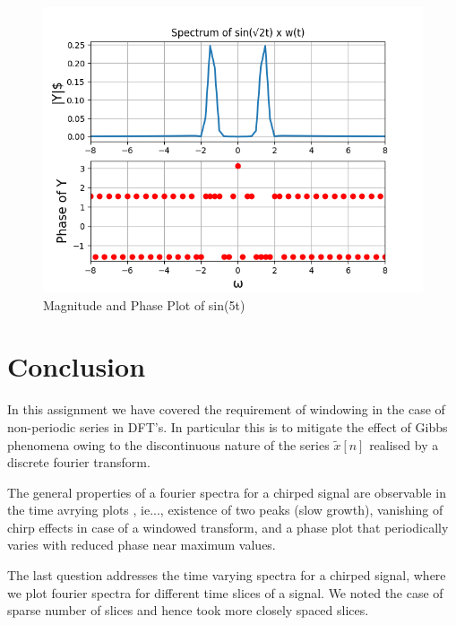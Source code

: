 \documentclass{article}
\begin{document}
  \begin{figure}[!ht]
  \centering
  \includegraphics[scale=0.6]{fig10-7.png}
  \caption{Magnitude and Phase Plot of sin(5t)}
  \label{fig:sample}
  \end{figure}

\newpage
\section{Conclusion}
In this assignment we have covered the requirement of windowing in the case of non-periodic series in DFT's. In particular this is to mitigate the effect of Gibbs phenomena owing to the discontinuous nature of the series $\tilde{x}[n]$ realised by a discrete fourier transform.

The general properties of a fourier spectra for a chirped signal are observable in the time avrying plots , ie..., existence of two peaks (slow growth), vanishing of chirp effects in case of a windowed transform, and a phase plot that periodically varies with reduced phase near maximum values.

The last question addresses the time varying spectra for a chirped signal, where we plot fourier spectra for different time slices of a signal. We noted the case of sparse number of slices and hence took more closely spaced slices.
\end{document}

